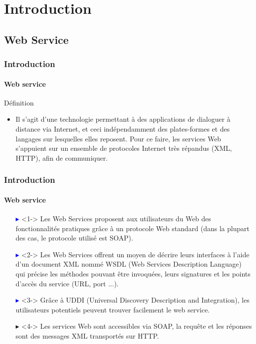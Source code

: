 \section{Introduction}

\subsection{Web Service}

\begin{frame}
\transsplitverticalout[duration=1.5]
\frametitle{Introduction}
\framesubtitle{Web service}
\begin{block}{Définition}
\begin{itemize}
\item Il s'agit d'une technologie permettant à des applications de dialoguer à distance via Internet, et ceci indépendamment des plates-formes et des langages sur lesquelles elles reposent. Pour ce faire, les services Web s'appuient sur un ensemble de protocoles Internet très répandus (\textcolor{deepblue}{XML}, \textcolor{deepblue}{HTTP}), afin de communiquer.
\end{itemize}
\end{block}
\end{frame}


\begin{frame}
\transsplithorizontalout[duration=1]
\frametitle{Introduction}
\framesubtitle{Web service}
\begin{itemize}
\item[\textcolor{blue}{$\blacktriangleright$}]<1-> Les Web Services proposent aux utilisateurs du Web des fonctionnalités pratiques grâce à un protocole Web standard (dans la plupart des cas, le protocole utilisé est \textcolor{deepblue}{SOAP}).
\item[\textcolor{blue}{$\blacktriangleright$}]<2-> Les Web Services offrent un moyen de décrire leurs interfaces à l'aide d'un document \textcolor{deepblue}{XML} nommé \textcolor{deepblue}{WSDL} (Web Services Description Language) qui précise les méthodes pouvant être invoquées, leurs signatures et les points d'accès du service (URL, port ...).
\item[\textcolor{blue}{$\blacktriangleright$}]<3-> Grâce à \textcolor{deepblue}{UDDI} (Universal Discovery Description and Integration), les utilisateurs potentiels peuvent trouver facilement le web service.
\item[\textcolor{colname}{$\blacktriangleright$}]<4-> Les services Web sont accessibles via \textcolor{deepgreen}{SOAP}, la requête et les réponses sont des messages \textcolor{deepblue}{XML} transportés sur \textcolor{deepblue}{HTTP}.
\end{itemize}
\end{frame}


